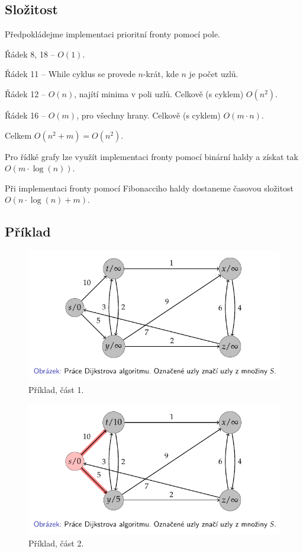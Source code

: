 \subsection{Složitost}

\begin{compactitem}
    \item Předpokládejme implementaci prioritní fronty pomocí pole.
    \item Řádek 8, 18 -- $O(1)$.
    \item Řádek 11 -- While cyklus se provede $n$-krát, kde $n$ je počet uzlů.
    \item Řádek 12 -- $O(n)$, najítí minima v poli uzlů. Celkově (s cyklem) $O(n^2)$.
    \item Řádek 16 -- $O(m)$, pro všechny hrany. Celkově (s cyklem) $O(m \cdot n)$.
    \item Celkem $O(n^2 + m) = O(n^2)$.
    \item Pro řídké grafy lze využít implementaci fronty pomocí binární haldy a získat tak $O(m \cdot \log(n))$.
    \item Při implementaci fronty pomocí Fibonacciho haldy dostaneme časovou složitost $O(n \cdot \log(n) + m)$.
\end{compactitem}

\subsection{Příklad}

\begin{figure}[H]
    \centering
    \includegraphics[width=0.80\linewidth]{example_dijkstra_p1.pdf}
    \caption{Příklad, část 1.}
\end{figure}

\begin{figure}[H]
    \centering
    \includegraphics[width=0.80\linewidth]{example_dijkstra_p2.pdf}
    \caption{Příklad, část 2.}
\end{figure}

